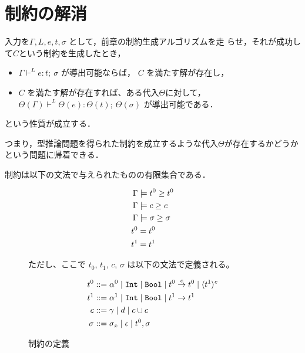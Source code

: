 
\section{制約の解消}

入力を$\Gamma, L, e, t,\sigma$ として，前章の制約生成アルゴリズムを走
らせ，それが成功して$C$という制約を生成したとき，
\begin{itemize}
\item
  $\Gamma \vdash^L e: t; ~ \sigma$ が導出可能ならば，
  $C$ を満たす解が存在し，
\item
  $C$ を満たす解が存在すれば、ある代入$\Theta$に対して，
  $\Theta(\Gamma) \vdash^L \Theta(e): \Theta(t) ;~ \Theta(\sigma)$ が導出可能である．
\end{itemize}
という性質が成立する．

つまり，型推論問題を得られた制約を成立するような代入$\Theta$が存在するかどうかという問題に帰着できる．

制約は以下の文法で与えられたものの有限集合である．

\begin{figure}[H]
  \centering
  \begin{align*}
    \Gamma &\models \longer{t^0}{t^0} \\
    \Gamma &\models \longer{c}{c} \\
    \Gamma &\models \longer{\sigma}{\sigma} \\
    t^0 &= t^0 \\
    t^1 &= t^1
  \end{align*}

  ただし、ここで $t_0$, $t_1$, $c$, $\sigma$ は以下の文法で定義される。

  \begin{align*}
    t^0      & ::= \alpha^0 \mid \Int \mid \Bool \mid \funT{t^0}{t^0}{c} \mid \codeT{t^1}{c} \\
    t^1      & ::= \alpha^1 \mid \Int \mid \Bool \mid \funT{t^1}{t^1}{} \\
    c        & ::= \gamma \mid d \mid c \uni c \\
    \sigma   & ::= \sigma_x \mid \epsilon \mid t^0, \sigma
  \end{align*}

  \caption{制約の定義}
  \label{fig:constr_def}
\end{figure}

